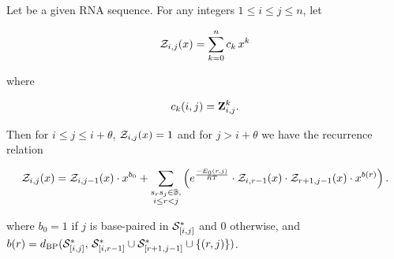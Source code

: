 \begin{theorem}
Let \seqN be a given RNA sequence.
For any integers $1 \leq i \leq j \leq n$, let

\begin{align}
{\mathcal Z}_{i,j}(x) = \sum_{k=0}^n c_k\,x^k
\end{align}

where

\begin{align}
c_k(i,j) = {\bf Z}^{k}_{i,j}.
\end{align}

Then for $i\leq j \leq i+\theta$, ${\mathcal Z}_{i,j}(x)=1$ and for
$j>i+\theta$ we have the recurrence relation

\begin{align}
\label{eq:fftbor:fftborNussPoly}
\emZ{i,j} = \emZ{i,j-1} \cdot x^{b_0} +
\sum_{\substack{s_r s_j \in \bpSet, \\ i\le r<j}}
\left(
\boltzNuss{r,j} \cdot \emZ{i,r-1} \cdot \emZ{r+1,j-1} \cdot x^{b(r)}
\right).
\end{align}

where $b_0 = 1$ if $j$ is base-paired in $\mathcal S^*_{[i,j]}$ and 0 otherwise, and
$b(r) =
d_{\text{BP}}(\mathcal S^*_{[i,j]},\,\mathcal S^*_{[i,r-1]} \cup \mathcal S^*_{[r+1,j-1]} \cup \{(r,j)\})$.
\end{theorem}

